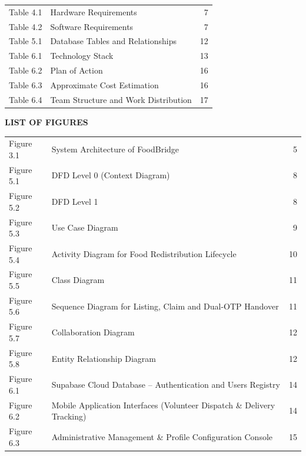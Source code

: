 \documentclass[12pt,a4paper]{article}
\begin{document}
\noindent
\begin{tabular*}{\textwidth}{@{\extracolsep{\fill}}llr}
    Table 4.1 & Hardware Requirements \dotfill & 7 \\[0.5cm]
    Table 4.2 & Software Requirements \dotfill & 7 \\[0.5cm]
    Table 5.1 & Database Tables and Relationships \dotfill & 12 \\[0.5cm]
    Table 6.1 & Technology Stack \dotfill & 13 \\[0.5cm]
    Table 6.2 & Plan of Action \dotfill & 16 \\[0.5cm]
    Table 6.3 & Approximate Cost Estimation \dotfill & 16 \\[0.5cm]
    Table 6.4 & Team Structure and Work Distribution \dotfill & 17 \\
\end{tabular*}

\newpage
\thispagestyle{empty}
\begin{center}
    \vspace*{0.4cm}
    {\Large \textbf{LIST OF FIGURES}}\\[0.8cm]
\end{center}

\noindent
\begin{tabular*}{\textwidth}{@{\extracolsep{\fill}}llr}
    Figure 3.1 & System Architecture of FoodBridge \dotfill & 5 \\[0.35cm]
    Figure 5.1 & DFD Level 0 (Context Diagram) \dotfill & 8 \\[0.35cm]
    Figure 5.2 & DFD Level 1 \dotfill & 8 \\[0.35cm]
    Figure 5.3 & Use Case Diagram \dotfill & 9 \\[0.35cm]
    Figure 5.4 & Activity Diagram for Food Redistribution Lifecycle \dotfill & 10 \\[0.35cm]
    Figure 5.5 & Class Diagram \dotfill & 11 \\[0.35cm]
    Figure 5.6 & Sequence Diagram for Listing, Claim and Dual-OTP Handover \dotfill & 11 \\[0.35cm]
    Figure 5.7 & Collaboration Diagram \dotfill & 12 \\[0.35cm]
    Figure 5.8 & Entity Relationship Diagram \dotfill & 12 \\[0.35cm]
    Figure 6.1 & Supabase Cloud Database -- Authentication and Users Registry \dotfill & 14 \\[0.35cm]
    Figure 6.2 & Mobile Application Interfaces (Volunteer Dispatch \& Delivery Tracking) \dotfill & 14 \\[0.35cm]
    Figure 6.3 & Administrative Management \& Profile Configuration Console \dotfill & 15 \\
\end{tabular*}
\end{document}
